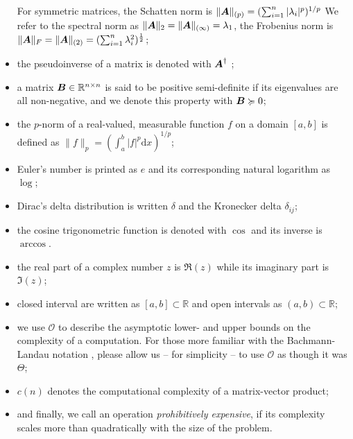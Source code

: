 \begin{itemize}
          For symmetric matrices, the Schatten norm is
          $\lVert \boldsymbol{A} \rVert _{(p)} = (\sum_{i=1}^n |\lambda_i|^p)^{1/p}$
          We refer to the spectral norm as
          $\lVert \boldsymbol{A} \rVert _2 = \lVert \boldsymbol{A} \rVert _{(\infty)} = \lambda_1$, the Frobenius norm
          is $\lVert \boldsymbol{A} \rVert _F = \lVert \boldsymbol{A} \rVert _{(2)} = (\sum_{i=1}^{n} \lambda_i^2)^{\frac{1}{2}}$;
    \item the pseudoinverse of a matrix is denoted with $\boldsymbol{A}^{\dagger}$ \cite{penrose1955pseudo};
    \item a matrix $\boldsymbol{B} \in \mathbb{R}^{n \times n}$ is said to be positive
          semi-definite if its eigenvalues are all non-negative, and we denote
          this property with $\boldsymbol{B} \succcurlyeq 0$;
    \item the $p$-norm of a real-valued, measurable function $f$ on a
          domain $[a, b]$ is defined as
          $\lVert f \rVert _{p} = (\int_{a}^{b} |f|^p \mathrm{d}x)^{1/p}$;
    \item Euler's number is printed as $e$ and its corresponding natural logarithm as $\log$;
    \item Dirac's delta distribution is written $\delta$ \cite[chapter~15]{dirac1947quantum}
          and the Kronecker delta $\delta_{ij}$;
    \item the cosine trigonometric function is denoted with $\cos$ and its inverse is $\arccos$.
    \item the real part of a complex number $z$ is $\Re(z)$ while its imaginary part is $\Im(z)$;
    \item closed interval are written as $[a, b] \subset \mathbb{R}$ and open
          intervals as $(a, b) \subset \mathbb{R}$;
    \item we use $\mathcal{O}$ to describe the asymptotic lower- and upper bounds
          on the complexity of a computation. For those more familiar with the
          Bachmann-Landau notation \cite[section~3.2]{cormen2009algorithms},
          please allow us -- for simplicity -- to use $\mathcal{O}$ as though it was $\Theta$;
    \item $c(n)$ denotes the computational complexity of a matrix-vector product;
    \item and finally, we call an operation \emph{prohibitively expensive}, if its
          complexity scales more than quadratically with the size of the problem.
\end{itemize}
